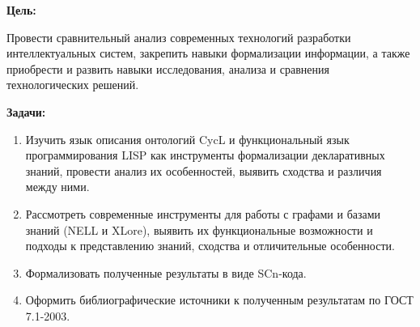 
\textbf{Цель:}

Провести сравнительный анализ современных технологий разработки интеллектуальных систем, закрепить навыки формализации информации, а также приобрести и развить навыки исследования, анализа и сравнения технологических решений.

\bigskip

\textbf{Задачи:}

\begin{enumerate}
    \item Изучить язык описания онтологий CycL и функциональный язык программирования LISP как инструменты формализации декларативных знаний, провести анализ их особенностей, выявить сходства и различия между ними.
    \item Рассмотреть современные инструменты для работы с графами и базами знаний (NELL и XLore), выявить их функциональные возможности и подходы к представлению знаний, сходства и отличительные особенности.
    \item Формализовать полученные результаты в виде SCn-кода.
    \item Оформить библиографические источники к полученным результатам по ГОСТ 7.1-2003.
\end{enumerate}
